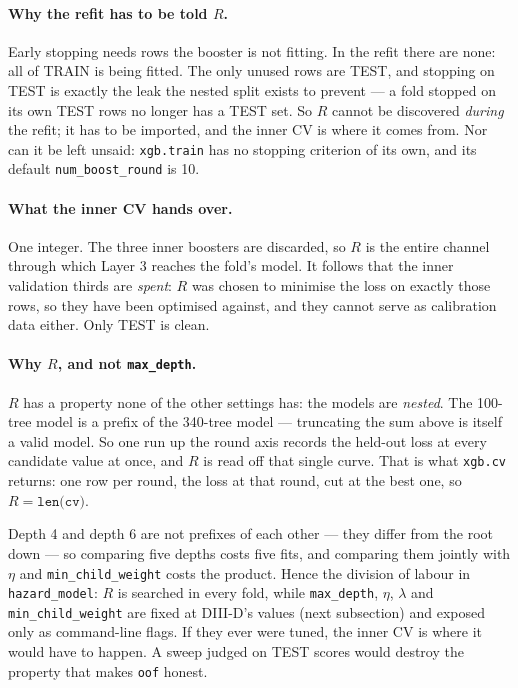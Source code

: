 \documentclass[11pt]{article}
\begin{document}
\paragraph{Why the refit has to be told $R$.}
Early stopping needs rows the booster is not fitting. In the refit there are
none: all of TRAIN is being fitted. The only unused rows are TEST, and
stopping on TEST is exactly the leak the nested split exists to prevent --- a
fold stopped on its own TEST rows no longer has a TEST set. So $R$ cannot be
discovered \emph{during} the refit; it has to be imported, and the inner CV is
where it comes from. Nor can it be left unsaid: \texttt{xgb.train} has no
stopping criterion of its own, and its default \texttt{num\_boost\_round} is
10.

\paragraph{What the inner CV hands over.}
One integer. The three inner boosters are discarded, so $R$ is the entire
channel through which Layer 3 reaches the fold's model. It follows that the
inner validation thirds are \emph{spent}: $R$ was chosen to minimise the loss
on exactly those rows, so they have been optimised against, and they cannot
serve as calibration data either. Only TEST is clean.

\paragraph{Why $R$, and not \texttt{max\_depth}.}
$R$ has a property none of the other settings has: the models are
\emph{nested}. The 100-tree model is a prefix of the 340-tree model ---
truncating the sum above is itself a valid model. So one run up the round axis
records the held-out loss at every candidate value at once, and $R$ is read
off that single curve. That is what \texttt{xgb.cv} returns: one row per
round, the loss at that round, cut at the best one, so $R=\texttt{len(cv)}$.

Depth 4 and depth 6 are not prefixes of each other --- they differ from the
root down --- so comparing five depths costs five fits, and comparing them
jointly with $\eta$ and \texttt{min\_child\_weight} costs the product. Hence
the division of labour in \texttt{hazard\_model}: $R$ is searched in every
fold, while \texttt{max\_depth}, $\eta$, $\lambda$ and
\texttt{min\_child\_weight} are fixed at DIII-D's values (next subsection) and
exposed only as command-line flags. If they ever were tuned, the inner CV is
where it would have to happen. A sweep judged on TEST scores would destroy the
property that makes \texttt{oof} honest.
\end{document}
